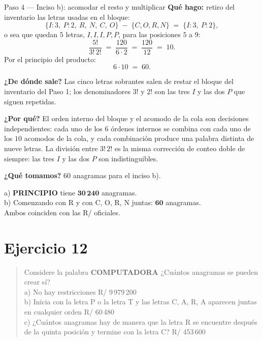 \documentclass[11pt]{article}
\begin{document}
\begin{paso}{Paso 4 --- Inciso b): acomodar el resto y multiplicar}
\textbf{Qué hago:} retiro del inventario las letras usadas en el bloque:
\[
\{I{:}3,\ P{:}2,\ R,\ N,\ C,\ O\}\;-\;\{C,O,R,N\} \;=\; \{I{:}3,\ P{:}2\},
\]
o sea que quedan $5$ letras, $I,I,I,P,P$, para las posiciones $5$ a $9$:
\[
\frac{5!}{3!\,2!} \;=\; \frac{120}{6\cdot 2} \;=\; \frac{120}{12} \;=\; 10 .
\]
Por el principio del producto:
\[
6\cdot 10 \;=\; 60 .
\]

\textbf{¿De dónde sale?} Las cinco letras sobrantes salen de restar el bloque del inventario del Paso 1; los
denominadores $3!$ y $2!$ son las tres $I$ y las dos $P$ que siguen repetidas.

\textbf{¿Por qué?} El orden interno del bloque y el acomodo de la cola son decisiones independientes: cada
uno de los $6$ órdenes internos se combina con cada uno de los $10$ acomodos de la cola, y cada combinación
produce una palabra distinta de nueve letras. La división entre $3!\,2!$ es la misma corrección de conteo
doble de siempre: las tres $I$ y las dos $P$ son indistinguibles.

\textbf{¿Qué tomamos?} $60$ anagramas para el inciso b).
\end{paso}

\begin{resp}
a) \textbf{PRINCIPIO} tiene $\mathbf{30\,240}$ anagramas.\\
b) Comenzando con R y con C, O, R, N juntas: $\mathbf{60}$ anagramas.\\
Ambos coinciden con las R/ oficiales.
\end{resp}

\section*{Ejercicio 12}

\begin{quote}
Considere la palabra \textbf{COMPUTADORA} ¿Cuántos anagramas se pueden crear sí?\\
a) No hay restricciones \hfill R/ 9\,979\,200\\
b) Inicia con la letra P o la letra T y las letras C, A, R, A aparecen juntas en cualquier orden
\hfill R/ 60\,480\\
c) ¿Cuántos anagramas hay de manera que la letra R se encuentre después de la quinta posición y termine con
la letra C? \hfill R/ 453\,600
\end{quote}
\end{document}
